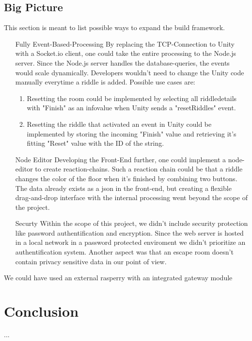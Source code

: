 \subsection{Big Picture}
This section is meant to list possible ways to expand the build framework.
\begin{enumerate}
    \item [Fully Event-Based-Processing] 
    By replacing the TCP-Connection to Unity with a Socket.io client, 
    one could take the entire processing to the Node.js server. Since the Node.js server handles the database-queries,
    the events would scale dynamically. Developers wouldn't need to change the Unity code manually everytime a riddle is added. 
    Possible use cases are:
    \begin{enumerate}
        \item Resetting the room could be implemented by selecting all riddledetails with "Finish" as an infovalue when Unity sends a "resetRiddles" event.
        \item 
        Resetting the riddle that activated an event in Unity could be implemented by storing the incoming "Finish" 
        value and retrieving it's fitting "Reset" value with the ID of the string.
    \end{enumerate}
    \item [Node Editor]
    Developing the Front-End further, one could implement a node-editor to create reaction-chains. 
    Such a reaction chain could be that a riddle changes the color of the floor when it's finished by combining two buttons. 
    The data already exists as a json in the front-end, but creating a flexible drag-and-drop interface with the internal processing 
    went beyond the scope of the project. 
    \item [Securty] 
    Within the scope of this project, we didn't include security protection like password authentification and encryption.
    Since the web server is hosted in a local network in a password protected enviroment we didn't prioritize an authentification system.
    Another aspect was that an escape room doesn't contain privacy sensitive data in our point of view.
\end{enumerate}
We could have used an external rasperry with an integrated gateway module
\section{Conclusion}
...




